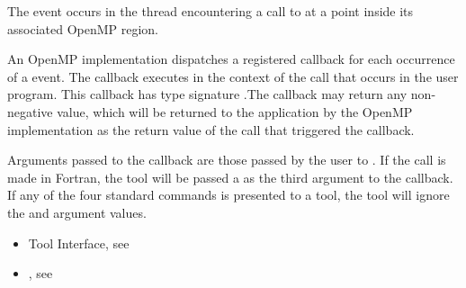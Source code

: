\events

The  event occurs in the thread encountering a call
to  at a point inside its associated OpenMP region.

\tools

An OpenMP implementation dispatches a registered
 callback for each occurrence of a
 event.  The callback executes in the context of the
call that occurs in the user program.  This callback has type
signature .The callback may return
any non-negative value, which will be returned to the application by
the OpenMP implementation as the return value of the
 call that triggered the callback.


Arguments passed to the callback are those passed by the user to
. If the call is made in Fortran, the tool
will be passed a  as the third argument to the callback. If
any of the four standard commands is presented to a tool, the tool
will ignore the  and  argument values.



\crossreferences
\begin{itemize}
\item Tool Interface, see
\item {}, see 
\end{itemize}



